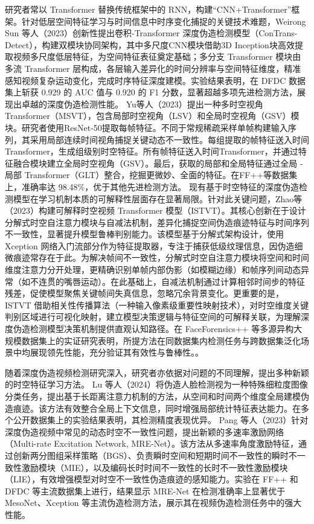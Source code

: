 \documentclass[conference]{IEEEtran}
\begin{document}
研究者常以 Transformer 替换传统框架中的 RNN，构建“CNN+Transformer”框架。针对低层空间特征学习与时间信息中时序变化捕捉的关键技术难题，Weirong Sun 等人（2023）创新性提出卷积-Transformer 深度伪造检测模型（ConTrans-Detect），构建双模块协同架构，其中多尺度CNN模块借助3D Inception块高效提取视频多尺度低层特征，为空间特征表征奠定基础；多分支 Transformer 模块由多流 Transformer 层构成，各层输入差异化的时间分辨率与空间特征维度，精准感知视频复杂运动变化，完成时序特征深度建模。实验结果表明，在 DFDC 数据集上斩获 0.929 的 AUC 值与 0.920 的 F1 分数，显著超越多项先进检测方法，展现出卓越的深度伪造检测性能\cite{WY406}。
Yu等人（2023）提出一种多时空视角 Transformer（MSVT），包含局部时空视角（LSV）和全局时空视角（GSV）模块。研究者使用ResNet-50提取每帧特征。不同于常规稀疏采样单帧构建输入序列，其采用局部连续时间视角捕捉关键动态不一致性。每组提取的帧特征送入时间 Transformer，生成组级别时空特征。所有帧特征送入时间Transformer，并通过特征融合模块建立全局时空视角（GSV）。最后，获取的局部和全局特征通过全局 - 局部 Transformer（GLT）整合，挖掘更微妙、全面的特征。在FF++等数据集上，准确率达 98.48\%，优于其他先进检测方法\cite{YuNi-129}。
现有基于时空特征的深度伪造检测模型在学习机制本质的可解释性层面存在显著局限。针对此关键问题，Zhao等（2023）构建可解释时空视频 Transformer 模型（ISTVT）。其核心创新在于设计分解式时空自注意力模块与自减法机制，差异化捕捉空间伪造痕迹特征与时间序列不一致性，显著提升模型鲁棒判别能力。该模型基于分解式架构设计，使用 Xception 网络入门流部分作为特征提取器，专注于捕获低级纹理信息，因伪造细微痕迹常存在于此。为解决帧间不一致性，分解式时空自注意力模块将空间和时间维度注意力分开处理，更精确识别单帧内部伪影（如模糊边缘）和帧序列间动态异常（如不连贯的嘴唇运动）。在此基础上，自减法机制通过计算相邻时间步的特征残差，促使模型聚焦关键帧间失真信息，忽略冗余背景变化。更重要的是，ISTVT 借助相关性传播算法（一种输入像素级重要性映射技术），对时空维度关键判别区域进行可视化映射，建立模型决策逻辑与特征空间的可解释关联，为理解深度伪造检测模型决策机制提供直观认知路径。在 FaceForensics++ 等多源异构大规模数据集上的实证研究表明，所提方法在同数据集内检测任务与跨数据集泛化场景中均展现领先性能，充分验证其有效性与鲁棒性。\cite{ZhaoWang-68}。

随着深度伪造视频检测研究深入，研究者亦依据对问题的不同理解，提出多种新颖的时空特征学习方法。
Lu 等人（2024）将伪造人脸检测视为一种特殊细粒度图像分类任务，提出基于长距离注意力机制的方法，从空间和时间两个维度全局建模伪造痕迹。该方法有效整合全局上下文信息，同时增强局部统计特征表达能力。在多个公开数据集上的实验结果表明，其检测精度表现优异\cite{LuLiu-167}。
Pang 等人（2023）针对深度伪造视频中常见的动态时空不一致性问题，提出新颖的多速率激励网络（Multi-rate Excitation Network, MRE-Net）。该方法从多速率角度激励特征，通过创新两分图组采样策略（BGS）、负责瞬时空间和短期时间不一致性的瞬时不一致性激励模块（MIE），以及编码长时时间不一致性的长时不一致性激励模块（LIE），有效增强模型对时空不一致性伪造痕迹的感知能力。实验在 FF++ 和 DFDC 等主流数据集上进行，结果显示 MRE-Net 在检测准确率上显著优于 MesoNet、Xception 等主流伪造检测方法，展示其在视频伪造检测任务中的强大性能\cite{PangZhang-372}。
\end{document}
